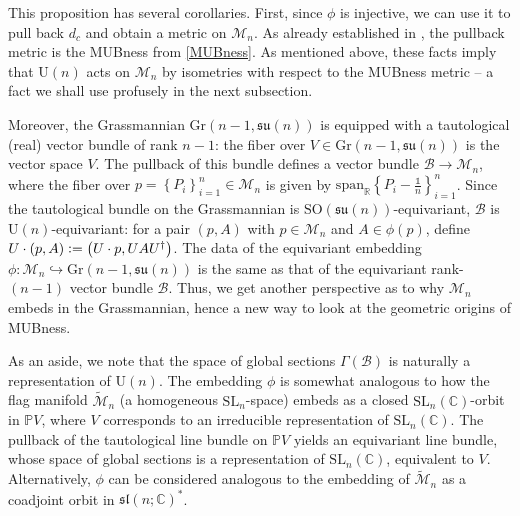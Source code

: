 \documentclass[referee,sn-mathphys-num]{sn-jnl}%
\theoremstyle{thmstyleone}%
\theoremstyle{thmstyletwo}%
\theoremstyle{remark}
\theoremstyle{thmstylethree}%
\newcommand{\defeq}{\vcentcolon=}
\begin{document}
This proposition has several corollaries. First, since $\phi$ is injective, we can use it to pull back $ d_c $ and obtain a metric on $ \mathcal{M}_n $. As already established in \cite{bengtsson2007three}, the pullback metric is the MUBness from \eqref{MUBness}. As mentioned above, these facts imply that $ \mathrm{U} \left( n \right) $ acts on $ \mathcal{M}_n $ by isometries with respect to the MUBness metric -- a fact we shall use profusely in the next subsection.

Moreover, the Grassmannian $ \mathrm{Gr} \left( n-1, \mathfrak{su} \left( n \right) \right) $ is equipped with a tautological (real) vector bundle of rank $n-1$: the fiber over $ V \in \mathrm{Gr} \left( n-1, \mathfrak{su} \left( n \right) \right) $ is the vector space $V$. The pullback of this bundle defines a vector bundle $ \mathcal{B} \rightarrow \mathcal{M}_n $, where the fiber over $ p = \left\{ P_i \right\}_{i=1}^n \in \mathcal{M}_n $ is given by $ \mathrm{span}_{\mathbb{R}} \left\{ P_i -\frac{\mathds{1}}{n} \right\}_{i=1}^n $. Since the tautological bundle on the Grassmannian is $ \mathrm{SO} \left( \mathfrak{su} \left( n \right) \right) $-equivariant, $ \mathcal{B} $ is $ \mathrm{U} \left( n \right) $-equivariant: for a pair $ \left( p, A \right) $ with $ p \in \mathcal{M}_n $ and $ A \in \phi \left( p \right) $, define $ U \cdot \left( p, A \right) \defeq \left( U \cdot p, U A U^\dagger \right) $. The data of the equivariant embedding $\phi : \mathcal{M}_n \hookrightarrow \mathrm{Gr} \left( n-1, \mathfrak{su} \left( n \right) \right) $ is the same as that of the equivariant rank-$\left( n-1 \right)$ vector bundle $ \mathcal{B} $. Thus, we get another perspective as to why $ \mathcal{M}_n $ embeds in the Grassmannian, hence a new way to look at the geometric origins of MUBness.

As an aside, we note that the space of global sections $ \Gamma \left( \mathcal{B} \right) $ is naturally a representation of $ \mathrm{U} \left( n \right) $.
The embedding $\phi$ is somewhat analogous to how the flag manifold $ \tilde{\mathcal{M}}_n $ (a homogeneous $ \mathrm{SL}_n$-space) embeds as a closed $ \mathrm{SL}_n \left( \mathbb{C} \right) $-orbit in $ \mathbb{P} V $, where $V$ corresponds to an irreducible representation of $ \mathrm{SL}_n \left( \mathbb{C} \right) $. The pullback of the tautological line bundle on $ \mathbb{P} V $ yields an equivariant line bundle, whose space of global sections is a representation of $ \mathrm{SL}_n \left( \mathbb{C} \right) $, equivalent to $V$. Alternatively, $\phi$ can be considered analogous to the embedding of $ \tilde{\mathcal{M}}_n $ as a coadjoint orbit in $ \mathfrak{sl} \left( n; \mathbb{C} \right)^* $.
\end{document}
